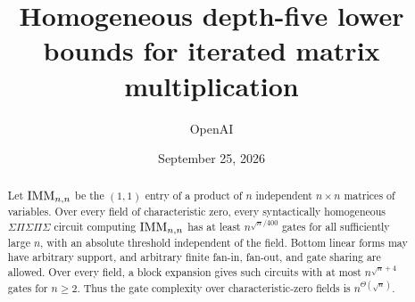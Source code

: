 \documentclass[11pt]{article}
\title{Homogeneous depth-five lower bounds for iterated matrix multiplication}
\author{OpenAI}
\date{September 25, 2026}
\begin{document}
\maketitle
\begin{abstract}
Let $\operatorname{IMM}_{n,n}$ be the $(1,1)$ entry of a product of $n$ independent
$n\times n$ matrices of variables. Over every field of characteristic zero,
every syntactically homogeneous $\Sigma\Pi\Sigma\Pi\Sigma$ circuit
computing $\operatorname{IMM}_{n,n}$ has at least $n^{\sqrt n/400}$ gates for all
sufficiently large $n$, with an absolute threshold independent of the field.
Bottom linear forms may have arbitrary support, and arbitrary finite
fan-in, fan-out, and gate sharing are allowed. Over every field, a block
expansion gives such circuits with at most $n^{\sqrt n+4}$ gates for $n\geq2$.
Thus the gate complexity over characteristic-zero fields is
$n^{\Theta(\sqrt n)}$.
\end{abstract}
\tableofcontents








\end{document}
